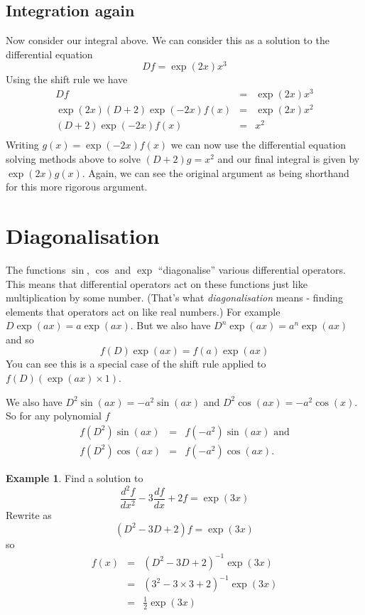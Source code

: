 \documentclass[a4paper]{article}
\theoremstyle{definition}
\newtheorem{example}{Example}[section]
\begin{document}
\subsection{Integration again}
Now consider our integral above.
We can consider this as a solution to the differential equation
\[
Df = \exp(2x)x^3
\]
Using the shift rule we have
\begin{eqnarray*}
Df & = & \exp(2x)x^3 \\
\exp(2x)(D+2)\exp(-2x)f(x) & = & \exp(2x)x^2 \\
(D+2)\exp(-2x)f(x) & = & x^2 \\
\end{eqnarray*}
Writing $g(x) = \exp(-2x)f(x)$ we can now use the differential equation solving methods above to solve $(D+2)g = x^2$ and our final integral is given by $\exp(2x)g(x)$.
Again, we can see the original argument as being shorthand for this more rigorous argument.

\section{Diagonalisation}
The functions $\sin$, $\cos$ and $\exp$ ``diagonalise'' various differential operators.
This means that differential operators act on these functions just like multiplication by some number.
(That's what \emph{diagonalisation} means - finding elements that operators act on like real numbers.)
For example $D\exp(ax) = a\exp(ax)$.
But we also have $D^n\exp(ax) = a^n\exp(ax)$ and so
\[
f(D)\exp(ax) = f(a)\exp(ax)
\]
You can see this is a special case of the shift rule applied to $f(D)(\exp(ax)\times1)$.

We also have $D^2\sin(ax) = -a^2\sin(ax)$ and $D^2\cos(ax) = -a^2\cos(x)$.
So for any polynomial $f$
\begin{eqnarray*}
f(D^2)\sin(ax) & = & f(-a^2)\sin(ax) \mbox { and} \\
f(D^2)\cos(ax) & = & f(-a^2)\cos(ax).
\end{eqnarray*}

\begin{example}
Find a solution to
\[
\frac{d^2f}{dx^2}-3\frac{df}{dx}+2f = \exp(3x)
\]
Rewrite as
\[
(D^2-3D+2)f = \exp(3x)
\]
so
\begin{eqnarray*}
f(x) & = & (D^2-3D+2)^{-1}\exp(3x) \\
     & = & (3^2-3\times3+2)^{-1}\exp(3x) \\
     & = & \frac{1}{2}\exp(3x) \\
\end{eqnarray*}
\end{example}
\end{document}
